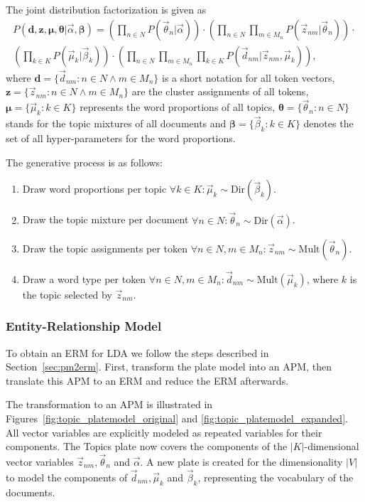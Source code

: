 The joint distribution factorization is given as
\begin{multline}
P(\boldsymbol{d},\boldsymbol{z}, \boldsymbol{\mu}, \boldsymbol{\theta} | \vec \alpha, \boldsymbol{\beta}) =
 \left(\prod_{n \in N} P(\vec \theta_n | \vec \alpha)\right) \cdot
 \left(\prod_{n \in N} \prod_{m \in M_n} P(\vec z_{nm} | \vec \theta_n)\right) \cdot \\
 \left(\prod_{k \in K} P(\vec \mu_k | \vec \beta_k)\right) \cdot
 \left(\prod_{n \in N} \prod_{m \in M_n} \prod_{k \in K}P(\vec d_{nm} | \vec z_{nm}, \vec \mu_k)\right),
\end{multline}
where $\boldsymbol{d} = \{\vec d_{nm} : n \in N \land m \in M_n \}$ is a short notation for all token vectors, $\boldsymbol{z} = \{ \vec z_{nm} : n \in N \land m \in M_n \}$ are the cluster assignments of all tokens, $\boldsymbol{\mu} = \{ \vec \mu_k : k \in K \}$ represents the word proportions of all topics, $\boldsymbol{\theta} = \{ \vec \theta_n : n \in N \}$ stands for the topic mixtures of all documents and $\boldsymbol{\beta} = \{ \vec \beta_k : k \in K \}$ denotes the set of all hyper-parameters for the word proportions.

The generative process is as follows:
\begin{enumerate}
\item Draw word proportions per topic $\forall k \in K: \vec \mu_k \sim \text{Dir}(\vec \beta_k)$.
\item Draw the topic mixture per document $\forall n \in N: \vec \theta_n \sim \text{Dir}(\vec \alpha)$.
\item Draw the topic assignments per token $\forall n \in N, m \in M_n: \vec z_{nm} \sim \text{Mult}(\vec \theta_n)$.
\item Draw a word type per token $\forall n \in N, m \in M_n: \vec d_{nm} \sim \text{Mult}(\vec \mu_k)$, where $k$ is the topic selected by $\vec z_{nm}$.
\end{enumerate}

\subsubsection{Entity-Relationship Model}

To obtain an ERM for LDA we follow the steps described in Section~\ref{sec:pm2erm}. First, transform the plate model into an APM, then translate this APM to an ERM and reduce the ERM afterwards.

The transformation to an APM is illustrated in Figures~\ref{fig:topic_platemodel_original} and \ref{fig:topic_platemodel_expanded}. All vector variables are explicitly modeled as repeated variables for their components. The Topics plate now covers the components of the $|K|$-dimensional vector variables $\vec z_{nm}, \vec \theta_n$ and $\vec \alpha$. A new plate is created for the dimensionality $|V|$ to model the components of $\vec d_{nm}, \vec \mu_k$ and $\vec \beta_k$, representing the vocabulary of the documents.

